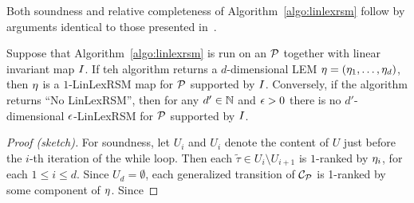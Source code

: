 Both soundness and relative completeness of Algorithm~\ref{algo:linlexrsm} follow by arguments identical to those presented in~\cite{xxx}. 
\begin{theorem}
	Suppose that Algorithm~\ref{algo:linlexrsm} is run on an \APP{} $\mathcal{P}$ together with linear invariant map $I$. If teh algorithm returns a $d$-dimensional LEM $\mathbf{\eta}=(\eta_1,\dots,\eta_d)$, then $\mathbf{\eta}$ is a $1$-LinLexRSM map for $\mathcal{P}$ supported by $I$. Conversely, if the algorithm returns ``No LinLexRSM'', then for any $d'\in \mathbb{N}$ and $\epsilon>0$ there is no $d'$-dimensional $\epsilon$-LinLexRSM for $\mathcal{P}$  supported by $I$.
\end{theorem}
\begin{proof}[Proof (sketch)]
For soundness, let $U_i$ and $U_{i}$ denote the content of $U$ just before the $i$-th iteration of the while loop. Then each $\tilde{\tau}\in U_{i}\setminus U_{i+1}$ is $1$-ranked by $\eta_i$, for each $1\leq i \leq d$. Since $U_{d}=\emptyset$, each generalized transition of $\mathcal{C}_{\mathcal{P}}$ is 1-ranked by some component of $\mathbf{\eta}$. Since 
\end{proof}

\